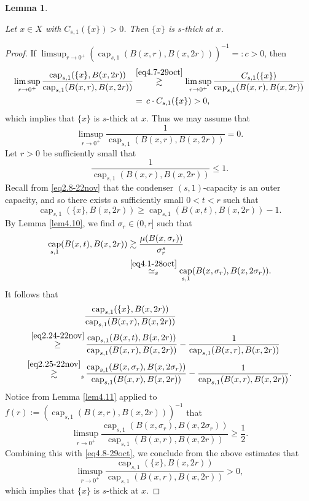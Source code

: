 \documentclass[11pt,leqno]{amsart}
\newtheorem{lemma}[theorem]{Lemma}
\numberwithin{equation}{section}
\theoremstyle{definition}
\DeclareMathOperator{\capp}{cap}
\newcommand{\caps}{\capp_{s,1}}
\begin{document}
	\begin{lemma}\label{lem2.12-15dec}
		
		
		Let $x\in X$ with $C_{s,1}(\{ x\})>0$. Then $\{x\}$ is $s$-thick at $x$.
	\end{lemma}
	\begin{proof}
		If $\limsup_{r\to0^+}\left(\caps(B(x,r), B(x,2r))\right)^{-1}=:c>0$, then
		\begin{align*}
			\limsup_{r\to0^+}\frac{\caps(\{x\}, B(x,2r))}{\caps(B(x,r),B(x,2r))}&\overset{\eqref{eq4.7-29oct}}{\gtrsim} \limsup_{r\to0^+}\frac{{C}_{s,1}(\{x\} )}{\caps(B(x,r),B(x,2r))}\\
			&=\, c \cdot {C_{s,1}(\{x\})}>0,
		\end{align*}
		which implies that $\{x\}$ is $s$-thick at $x$. Thus we may assume that 
		\begin{equation}\label{eq4.8-29oct}
			\limsup_{r\to0^+}\frac{1}{\caps(B(x,r),B(x,2r))}=0.
		\end{equation}
		Let $r>0$ {be} sufficiently small that
		\[
		\frac{1}{\caps(B(x,r),B(x,2r))}\leq 1.
		\]
		Recall from \eqref{eq2.8-22nov} that the condenser $(s,1)$-capacity is an outer capacity, and so there exists a sufficiently small $0<t<r$ such that 
		\begin{equation}\label{eq2.24-22nov}
			\caps(\{x\}, B(x,2r)) \geq \caps (B(x,t), B(x,2r)) -1.
		\end{equation}
		By Lemma \ref{lem4.10}, we find $\sigma_r\in(0,r]$ such that
		\begin{align}\notag
			\caps(B(x,t),B(x,2r))
			&\gtrsim   \frac{\mu(B(x,\sigma_r))}{\sigma_r^s }\\
			&\overset{\eqref{eq4.1-28oct}}{\simeq_s}   \caps(B(x,\sigma_r),B(x,2\sigma_r)).\label{eq2.25-22nov}
		\end{align}
		It follows that
		\begin{align*}
			&\frac{\caps(\{x\}, B(x,2r))} {\caps(B(x,r),B(x,2r))}\\
			\overset{\eqref{eq2.24-22nov}}{\geq} &\, \frac{{\rm cap}_{s,1}(B(x,t), B(x,2r))}{{\caps(B(x,r),B(x,2r))}}- \frac{1}{\caps(B(x,r),B(x,2r))}\\
			\overset{\eqref{eq2.25-22nov}}{\gtrsim}_s&\,  \frac{\caps (B(x,\sigma_r), B(x,2\sigma_r)) }{\caps(B(x,r),B(x,2r))}-  \frac{1}{\caps(B(x,r),B(x,2r))}.
		\end{align*}
		Notice from Lemma \ref{lem4.11} applied to $f(r):=\left(\caps(B(x,r),B(x,2r)) \right)^{-1}$ that
		\[
		\limsup_{r\to0^+} \frac{\caps (B(x,\sigma_r), B(x,2\sigma_r)) }{\caps(B(x,r),B(x,2r))}\geq \frac{1}{2}.
		\]
		Combining this with \eqref{eq4.8-29oct}, we conclude from the  above estimates that 
		\[
		\limsup_{r\to 0^+}\frac{\caps(\{x\},B(x,2r))}{\caps(B(x,r),B(x,2r))}>0,
		\]
		which implies that $\{x\}$ is $s$-thick at $x$.
	\end{proof}
	
\end{document}
